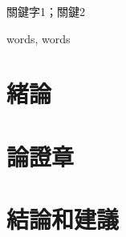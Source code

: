 \documentclass{format/MUSTThesisC}
\begin{document}




\AddToShipoutPicture{\BackgroundPic}



\def\Ctitle 		{中文題目}
\def\Etitle 		{英文題目}
\def\Sname 			{Y.J.Li}
\def\Sno 			{1809853G-BM30-0053}
\def\Sfaculty 		{商學院}
\def\Sprogram 		{XXX}
\def\Smajor 		{XXXX}
\def\Ssupervisor	{A/Prof.Jenny}
\def\Sdate			{\today}

\mustTitle



\mustCabstract
{
	
}
{關鍵字1；關鍵2}



\mustEabstract
{
	
}
{words, words}



\mustcontents



\linespread{1.65}\selectfont


\chapter{緒論}

\chapter{論證章}

\chapter{結論和建議}





\bibreference



\MUSTappendix{
	
}
\end{document}

